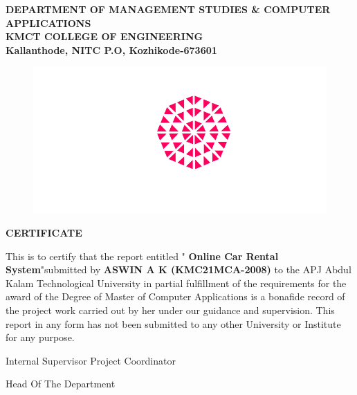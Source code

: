 \documentclass[a4paper,12pt,toc=flat]{report}
\begin{document}
	
	\begin{center}
		
		\textbf{
			\vspace*{8pt}
			DEPARTMENT OF MANAGEMENT STUDIES \& COMPUTER
			\vspace*{8pt}
			APPLICATIONS\\
			KMCT COLLEGE OF ENGINEERING\\
			\vspace*{8pt}
			Kallanthode, NITC P.O, Kozhikode-673601
		}
		
		\begin{figure}[bph]
			\centering
			\hspace{-35}
			\includegraphics[width=0.8023\linewidth]{"kmct.png"}
			\label{fig:ksblogo}
		\end{figure}
	\end{center}
	{\centering \bf \large
		CERTIFICATE\par
	}
	\vspace*{10pt}
	This is to certify that the report entitled "{\bf 
		Online Car Rental System}"submitted
	by {\bf ASWIN A K (KMC21MCA-2008)}
	to the APJ Abdul Kalam Technological University
	in partial fulfillment of the requirements for the award of the Degree of Master of Computer
	Applications is a bonafide record of the project work carried out by her under our guidance and
	supervision. This report in any form has not been submitted to any other University or Institute for
	any purpose.
	
	\begin{center}\vspace*{20pt}
		Internal Supervisor \hspace*{0pt} \hfill  Project Coordinator
	\end{center}
	
	\begin{center}\vspace*{40pt}
		\hspace*{0pt} \hfill  Head Of The Department
	\end{center}
	\pagebreak
	
\end{document}
